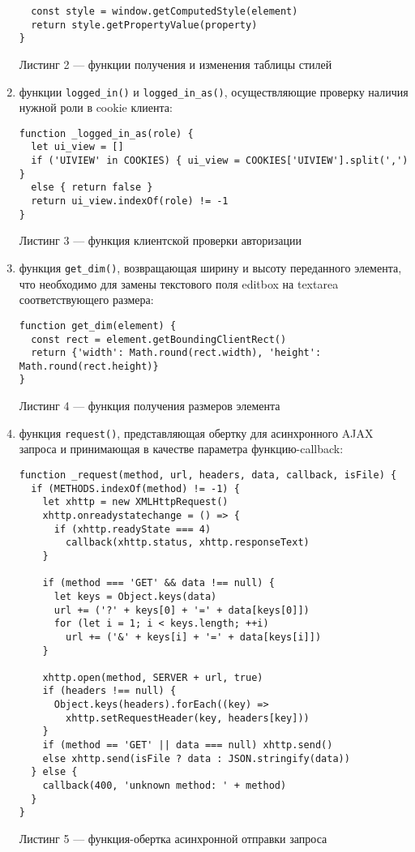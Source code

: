 \documentclass[14pt]{extarticle}
\begin{document}
\begin{enumerate}
\begin{lstlisting}
  const style = window.getComputedStyle(element)
  return style.getPropertyValue(property)
}
\end{lstlisting}
\begin{center}
Листинг 2 --- функции получения и изменения таблицы стилей
\end{center}
\item[] функции \texttt{logged\_in()} и \texttt{logged\_in\_as()}, осуществляющие проверку наличия нужной роли в cookie клиента:
\begin{lstlisting}
function _logged_in_as(role) {
  let ui_view = []
  if ('UIVIEW' in COOKIES) { ui_view = COOKIES['UIVIEW'].split(',') }
  else { return false }
  return ui_view.indexOf(role) != -1
}
\end{lstlisting}
\begin{center}
Листинг 3 --- функция клиентской проверки авторизации
\end{center}
\item [] функция \texttt{get\_dim()}, возвращающая ширину и высоту переданного элемента, что необходимо для замены текстового поля editbox на textarea соответствующего размера:
\begin{lstlisting}
function get_dim(element) {
  const rect = element.getBoundingClientRect()
  return {'width': Math.round(rect.width), 'height': Math.round(rect.height)}
}
\end{lstlisting}
\begin{center}
Листинг 4 --- функция получения размеров элемента
\end{center}
\item [] функция \texttt{request()}, представляющая обертку для асинхронного AJAX \cite{ajax} запроса и принимающая в качестве параметра функцию-callback:
\begin{lstlisting}
function _request(method, url, headers, data, callback, isFile) {
  if (METHODS.indexOf(method) != -1) {
    let xhttp = new XMLHttpRequest()
    xhttp.onreadystatechange = () => {
      if (xhttp.readyState === 4) 
        callback(xhttp.status, xhttp.responseText)
    }

    if (method === 'GET' && data !== null) {
      let keys = Object.keys(data)
      url += ('?' + keys[0] + '=' + data[keys[0]])
      for (let i = 1; i < keys.length; ++i)
        url += ('&' + keys[i] + '=' + data[keys[i]])
    }

    xhttp.open(method, SERVER + url, true)
    if (headers !== null) {
      Object.keys(headers).forEach((key) =>
        xhttp.setRequestHeader(key, headers[key]))
    }
    if (method == 'GET' || data === null) xhttp.send()
    else xhttp.send(isFile ? data : JSON.stringify(data))
  } else {
    callback(400, 'unknown method: ' + method)
  }
}
\end{lstlisting}
\begin{center}
Листинг 5 --- функция-обертка асинхронной отправки запроса
\end{center}
\end{enumerate}
\end{document}
